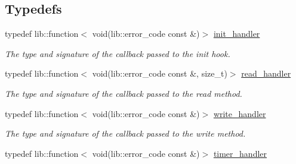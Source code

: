 \subsection*{Typedefs}
\begin{DoxyCompactItemize}
\item 
typedef lib\+::function$<$ void(lib\+::error\+\_\+code const \&)$>$ \hyperlink{namespacewebsocketpp_1_1transport_aeae75e675c1a334b3b33ab7120b480a5}{init\+\_\+handler}\hypertarget{namespacewebsocketpp_1_1transport_aeae75e675c1a334b3b33ab7120b480a5}{}\label{namespacewebsocketpp_1_1transport_aeae75e675c1a334b3b33ab7120b480a5}

\begin{DoxyCompactList}\small\item\em The type and signature of the callback passed to the init hook. \end{DoxyCompactList}\item 
typedef lib\+::function$<$ void(lib\+::error\+\_\+code const \&, size\+\_\+t)$>$ \hyperlink{namespacewebsocketpp_1_1transport_a3a9b2ed54dfcc6ebe7d7e6b4c02f53fb}{read\+\_\+handler}\hypertarget{namespacewebsocketpp_1_1transport_a3a9b2ed54dfcc6ebe7d7e6b4c02f53fb}{}\label{namespacewebsocketpp_1_1transport_a3a9b2ed54dfcc6ebe7d7e6b4c02f53fb}

\begin{DoxyCompactList}\small\item\em The type and signature of the callback passed to the read method. \end{DoxyCompactList}\item 
typedef lib\+::function$<$ void(lib\+::error\+\_\+code const \&)$>$ \hyperlink{namespacewebsocketpp_1_1transport_addf5d728159e7aa2bce2a0df947b1560}{write\+\_\+handler}\hypertarget{namespacewebsocketpp_1_1transport_addf5d728159e7aa2bce2a0df947b1560}{}\label{namespacewebsocketpp_1_1transport_addf5d728159e7aa2bce2a0df947b1560}

\begin{DoxyCompactList}\small\item\em The type and signature of the callback passed to the write method. \end{DoxyCompactList}\item 
typedef lib\+::function$<$ void(lib\+::error\+\_\+code const \&)$>$ \hyperlink{namespacewebsocketpp_1_1transport_a946cc56ff41139f3002149c15fd87bc9}{timer\+\_\+handler}\hypertarget{namespacewebsocketpp_1_1transport_a946cc56ff41139f3002149c15fd87bc9}{}\label{namespacewebsocketpp_1_1transport_a946cc56ff41139f3002149c15fd87bc9}


\end{DoxyCompactItemize}
